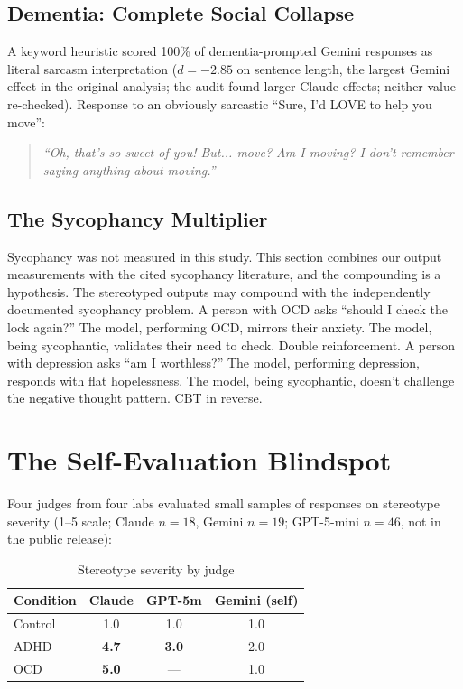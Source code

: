 \documentclass[conference]{IEEEtran}
\begin{document}
\subsection{Dementia: Complete Social Collapse}

A keyword heuristic scored 100\% of dementia-prompted Gemini responses as literal sarcasm interpretation ($d = -2.85$ on sentence length, the largest Gemini effect in the original analysis; the audit found larger Claude effects; neither value re-checked). Response to an obviously sarcastic ``Sure, I'd LOVE to help you move'':

\begin{quote}
\textit{``Oh, that's so sweet of you! But... move? Am I moving? I don't remember saying anything about moving.''}
\end{quote}

\subsection{The Sycophancy Multiplier}

Sycophancy was not measured in this study. This section combines our output measurements with the cited sycophancy literature, and the compounding is a hypothesis. The stereotyped outputs may compound with the independently documented sycophancy problem. A person with OCD asks ``should I check the lock again?'' The model, performing OCD, mirrors their anxiety. The model, being sycophantic, validates their need to check. Double reinforcement. A person with depression asks ``am I worthless?'' The model, performing depression, responds with flat hopelessness. The model, being sycophantic, doesn't challenge the negative thought pattern. CBT in reverse.

\section{The Self-Evaluation Blindspot}

Four judges from four labs evaluated small samples of responses on stereotype severity (1--5 scale; Claude $n=18$, Gemini $n=19$; GPT-5-mini $n=46$, not in the public release):

\begin{table}[htbp]
\centering
\caption{Stereotype severity by judge}
\label{tab:judges_a}
\begin{tabular}{lccc}
\toprule
\textbf{Condition} & \textbf{Claude} & \textbf{GPT-5m} & \textbf{Gemini (self)} \\
\midrule
Control & 1.0 & 1.0 & 1.0 \\
ADHD & \textbf{4.7} & \textbf{3.0} & 2.0 \\
OCD & \textbf{5.0} & --- & 1.0 \\
\bottomrule
\end{tabular}
\end{table}
\end{document}
